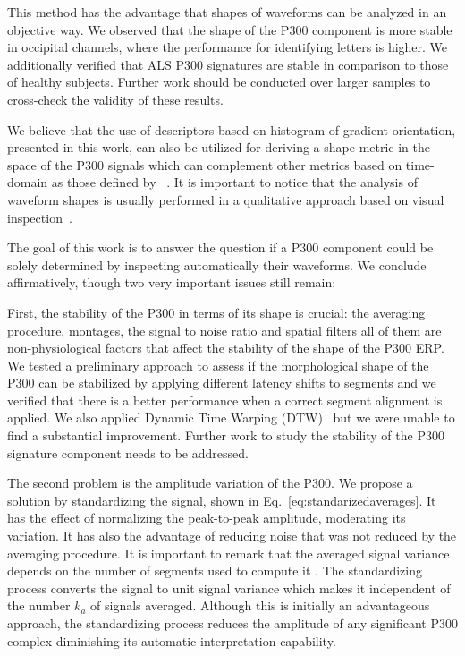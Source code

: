 \documentclass[utf8]{frontiersSCNS} %
\begin{document}

This method has the advantage that shapes of waveforms can be analyzed in an objective way.  We observed that the shape of the P300 component is more stable in occipital channels, where the performance for identifying letters is higher.   We additionally verified that ALS P300 signatures are stable in comparison to those of healthy subjects.  Further work should be conducted over larger samples to cross-check the validity of these results.

We believe that the use of descriptors based on histogram of gradient orientation, presented in this work, can also be utilized for deriving a shape metric in the space of the P300 signals which can complement other metrics based on time-domain as those defined by ~\cite{Mak2012}. It is important to notice that the analysis of waveform shapes is usually performed in a qualitative approach based on visual inspection~\citep{SellersandEmanuelDonchin2006}.

The goal of this work is to answer the question if a P300 component could be solely determined by inspecting automatically their waveforms.  We conclude affirmatively, though two very important issues still remain:

First, the stability of the P300 in terms of its shape is crucial: the averaging procedure, montages, the signal to noise ratio and spatial filters all of them are non-physiological factors that affect the stability of the shape of the P300 ERP.  We tested a preliminary approach to assess if the morphological shape of the P300 can be stabilized by applying different latency shifts to segments and we verified that there is a better performance when a correct segment alignment is applied.  We also applied Dynamic Time Warping (DTW)~\citep{Casarotto2005} but we were unable to find a substantial improvement.  Further work to study the stability of the P300 signature component needs to be addressed.

The second problem is the amplitude variation of the P300. We propose a solution by standardizing the signal, shown in Eq.~\ref{eq:standarizedaverages}. It has the effect of normalizing the peak-to-peak amplitude, moderating its variation. It has also the advantage of reducing noise that was not reduced by the averaging procedure.   It is important to remark that the averaged signal variance depends on the number of segments used to compute it \citep{van2006signal}.  The standardizing process converts the signal to unit signal variance which makes it independent of the number $k_a$ of signals averaged.   Although this is initially an advantageous approach, the standardizing process reduces the amplitude of any significant P300 complex diminishing its automatic interpretation capability.
\end{document}
